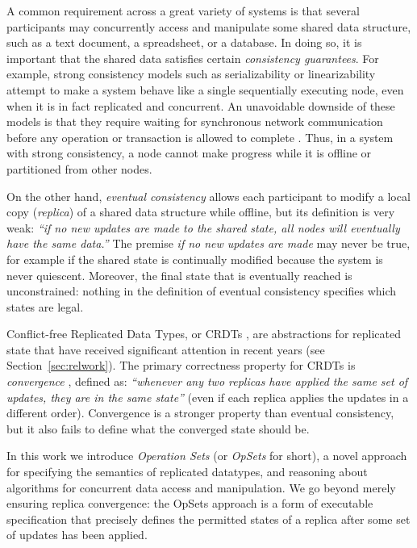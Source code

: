 \documentclass[11pt]{article}
\begin{document}
A common requirement across a great variety of systems is that several participants may concurrently access and manipulate some shared data structure, such as a text document, a spreadsheet, or a database.
In doing so, it is important that the shared data satisfies certain \emph{consistency guarantees}.
For example, strong consistency models such as serializability \cite{Kleppmann:2017wj} or linearizability \cite{Herlihy:1990jq} attempt to make a system behave like a single sequentially executing node, even when it is in fact replicated and concurrent.
An unavoidable downside of these models is that they require waiting for synchronous network communication before any operation or transaction is allowed to complete \cite{Davidson:1985hv,Gilbert:2002il}.
Thus, in a system with strong consistency, a node cannot make progress while it is offline or partitioned from other nodes.

On the other hand, \emph{eventual consistency} \cite{Bailis:2013jc,Burckhardt:2014hy,Terry:1994fp,Vogels:2009ca} allows each participant to modify a local copy (\emph{replica}) of a shared data structure while offline, but its definition is very weak: \emph{``if no new updates are made to the shared state, all nodes will eventually have the same data.''}
The premise \emph{if no new updates are made} may never be true, for example if the shared state is continually modified because the system is never quiescent.
Moreover, the final state that is eventually reached is unconstrained: nothing in the definition of eventual consistency specifies which states are legal.

Conflict-free Replicated Data Types, or CRDTs \cite{Shapiro:2011wy,Shapiro:2011un}, are abstractions for replicated state that have received significant attention in recent years (see Section~\ref{sec:relwork}).
The primary correctness property for CRDTs is \emph{convergence} \cite{Shapiro:2011un,Gomes:2017gy}, defined as: \emph{``whenever any two replicas have applied the same set of updates, they are in the same state''} (even if each replica applies the updates in a different order).
Convergence is a stronger property than eventual consistency, but it also fails to define what the converged state should be.

In this work we introduce \emph{Operation Sets} (or \emph{OpSets} for short), a novel approach for specifying the semantics of replicated datatypes, and reasoning about algorithms for concurrent data access and manipulation.
We go beyond merely ensuring replica convergence: the OpSets approach is a form of executable specification that precisely defines the permitted states of a replica after some set of updates has been applied.
\end{document}
